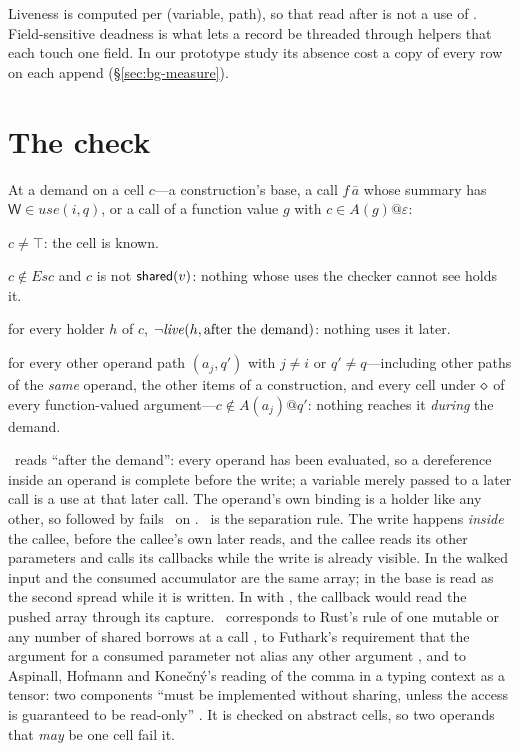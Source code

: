 Liveness is computed per (variable, path), so that  read after
 is not a use of . Field-sensitive deadness is what
lets a record be threaded through helpers that each touch one field. In our prototype study its absence
cost a copy of every row on each append (\S\ref{sec:bg-measure}).

\section{The check}
\label{sec:model-check}

At a demand on a cell $c$---a construction's base, a call $f\,\bar a$ whose summary has
$\mathsf{W} \in \mathit{use}(i, q)$, or a call of a function value $g$ with $c \in A(g)@\varepsilon$:

\begin{description}[leftmargin=1.2em,font=\normalfont]
\item[\Known] $c \neq \top$: the cell is known.
\item[\Unescaped] $c \notin \mathit{Esc}$ and $c$ is not $\mathsf{shared}(v)$: nothing whose uses the checker
cannot see holds it.
\item[\Dead] for every holder $h$ of $c$, $\neg\mathit{live}(h, \text{after the demand})$: nothing uses it
later.
\item[\Disjoint] for every other operand path $(a_j, q')$ with $j \neq i$ or $q' \neq q$---including
other paths of the \emph{same} operand, the other items of a construction, and every cell under $\diamond$
of every function-valued argument---$c \notin A(a_j)@q'$: nothing reaches it \emph{during} the
demand.
\end{description}

\Dead\ reads ``after the demand'': every operand has been evaluated, so a dereference inside an operand
is complete before the write; a variable merely passed to a later call is a use at that later call.
The operand's own binding is a holder like any other, so  followed by
 fails \Dead\ on . \Disjoint\ is the separation rule. The write happens
\emph{inside} the callee, before the callee's own later reads, and the callee reads its other parameters
and calls its callbacks while the write is already visible. In
 the walked input and the consumed accumulator
are the same array; in \code{[ …xs, …xs ]} the base is read as the second spread while it is written.
In  with , the callback would read
the pushed array through its capture. \Disjoint\ corresponds to Rust's rule of one mutable or any number
of shared borrows at a call \citep{rfc2094}, to Futhark's requirement that the argument for a consumed
parameter not alias any other argument \citep{henriksen2017thesis}, and to Aspinall, Hofmann and
Kone\v{c}n\'y's reading of the comma in a typing context as a tensor: two components ``must be
implemented without sharing, unless the access is guaranteed to be read-only''
\citep[\S3]{aspinall2008usage}. It is checked on abstract cells, so two operands that \emph{may} be one
cell fail it.

